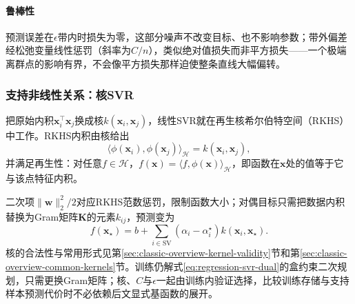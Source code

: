 \paragraph{鲁棒性}

预测误差在$\epsilon$带内时损失为零，这部分噪声不改变目标、也不影响参数；带外偏差经松弛变量线性惩罚（斜率为$C/n$），类似绝对值损失而非平方损失——一个极端离群点的影响有界，不会像平方损失那样迫使整条直线大幅偏转。

\subsubsection{支持非线性关系：核SVR}
\label{sec:regression-kernel-svr}

把原始内积$\bm{x}_i^{\top}\bm{x}_j$换成核$k(\bm{x}_i,\bm{x}_j)$，线性SVR就在再生核希尔伯特空间（RKHS）中工作。RKHS内积由核给出
\begin{equation}
  \langle\phi(\bm{x}_i),\phi(\bm{x}_j)\rangle_{\mathcal H}=k(\bm{x}_i,\bm{x}_j),
  \label{eq:regression-rkhs-inner-product}
\end{equation}
并满足再生性：对任意$f\in\mathcal H$，$f(\bm{x})=\langle f,\phi(\bm{x})\rangle_{\mathcal H}$，即函数在$\bm{x}$处的值等于它与该点特征内积。

二次项$\lVert\bm{w}\rVert_2^2/2$对应RKHS范数惩罚，限制函数大小；对偶目标只需把数据内积替换为Gram矩阵$\bm{K}$的元素$k_{ij}$，预测变为
\begin{equation}
  f(\bm{x}_\star)
  =b+\sum_{i\in\mathrm{SV}}(\alpha_i-\alpha_i^\star)k(\bm{x}_i,\bm{x}_\star).
  \label{eq:regression-kernel-svr-prediction}
\end{equation}
核的合法性与常用形式见第\ref{sec:classic-overview-kernel-validity}节和第\ref{sec:classic-overview-common-kernels}节。训练仍解式\eqref{eq:regression-svr-dual}的盒约束二次规划，只需更换Gram矩阵；核、$C$与$\epsilon$一起由训练内验证选择，比较训练存储与支持样本预测代价时不必依赖后文显式基函数的展开。
